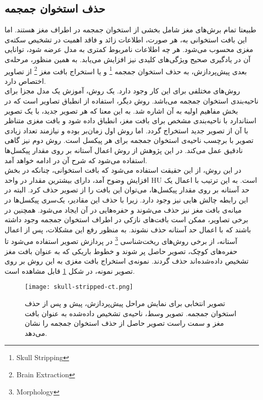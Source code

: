 \subsection{حذف استخوان جمجمه}

طبیعتا تمام برش‌های مغز شامل بخشی از استخوان جمجمه در اطراف مغز هستند.
اما این بافت استخوانی به، هر صورت، اطلاعات زائد و فاقد اهمیت در تشخیص سکته‌ی مغزی محسوب می‌شود.
هر چه اطلاعات نامربوط کمتری به مدل عرضه شود، توانایی آن در یادگیری صحیح ویژگی‌های کلیدی نیز افزایش می‌یابد.
به همین منظور، مرحله‌ی بعدی پیش‌پردازش، به حذف استخوان جمجمه
\footnote{Skull Stripping}
و یا استخراج بافت مغز
\footnote{Brain Extraction}
از تصاویر اختصاص دارد.\\

روش‌های مختلفی برای این کار وجود دارد.
یک روش، آموزش یک مدل مجزا برای ناحیه‌بندی استخوان جمجمه می‌باشد.
روش دیگر، استفاده از انطباق تصاویر است که در بخش مفاهیم اولیه به آن اشاره شد.
به این معنا که هر تصویر جدید، با یک تصویر استاندارد با ناحیه‌بندی مشخص برای بافت مغز، انطباق داده شود و بافت مغزی متناظر با آن از تصویر جدید استخراج گردد.
اما روش اول زمان‌بر بوده و نیازمند تعداد زیادی تصویر با برچسب ناحیه‌ی استخوان جمجمه برای هر پیکسل است.
روش دوم نیز گاهی نادقیق عمل می‌کند.
در این پژوهش از روش اعمال آستانه بر روی مقدار پیکسل‌ها استفاده می‌شود که شرح آن در ادامه خواهد آمد.\\

در این روش، از این حقیقت استفاده می‌شود که بافت استخوانی، چنانکه در بخش افزایش وضوح آمد، دارای بیشترین مقدار در واحد HU است.
به این ترتیب با اعمال یک حد آستانه بر روی مقدار پیکسل‌ها، می‌‌توان این بافت را از تصویر حذف کرد.
البته در این رابطه چالش هایی نیز وجود دارد.
زیرا با حذف این مقادیر، یک‌سری پیکسل‌ها در میانه‌ی بافت مغز نیز حذف می‌شوند و حفره‌هایی در آن ایجاد می‌شود.
همچنین در برخی تصاویر، ممکن است بافت‌های نازکی در اطراف استخوان جمجمه وجود داشته باشند که با اعمال حد آستانه حذف نشوند.
به منظور رفع این مشکلات، پس از اعمال آستانه، از برخی روش‌های ریخت‌شناسی
\footnote{Morphology}
در پردازش تصویر استفاده می‌شود تا
حفره‌های کوچک، تصویر حاصل پر شوند و 
خطوط باریکی که به عنوان بافت مغز تشخیص داده‌شده‌اند حذف گردند.
نمونه‌ی استخراج بافت مغزی به این روش بر روی تصویر نمونه، در شکل \ref{fig:skull-stripped-ct}
قابل مشاهده است.

\begin{figure}[ht]
\centering
\texttt{[image: skull-stripped-ct.png]}
\caption[]{تصویر انتخابی برای نمایش مراحل پیش‌پردازش، پیش و پس از حذف استخوان جمجمه. تصویر وسط، ناحیه‌ی تشخیص داده‌شده به عنوان بافت مغز و سمت راست تصویر حاصل از حذف استخوان جمجمه را نشان می‌دهد.}
\label{fig:skull-stripped-ct}
\end{figure}

